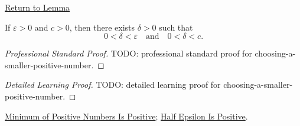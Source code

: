 \newpage
{}
\label{prf:choosing-a-smaller-positive-number}

\begin{remark*}[Return]
\hyperref[lem:choosing-a-smaller-positive-number]{Return to Lemma}
\end{remark*}

\begin{lemma*}
If $\varepsilon>0$ and $c>0$, then there exists $\delta>0$ such that
\[
0<\delta<\varepsilon
\quad\text{and}\quad
0<\delta<c.
\]
\end{lemma*}

\begin{proof}[Professional Standard Proof]
\LRAProofBodyStart
TODO: professional standard proof for choosing-a-smaller-positive-number.
\end{proof}

\begin{proof}[Detailed Learning Proof]
\LRAProofBodyStart
TODO: detailed learning proof for choosing-a-smaller-positive-number.
\end{proof}

\begin{remark*}
\end{remark*}

\begin{dependencies}
\hyperref[lem:minimum-of-positive-numbers-is-positive]{Minimum of Positive Numbers Is Positive};
\hyperref[lem:half-epsilon-is-positive]{Half Epsilon Is Positive}.
\end{dependencies}

\clearpage

